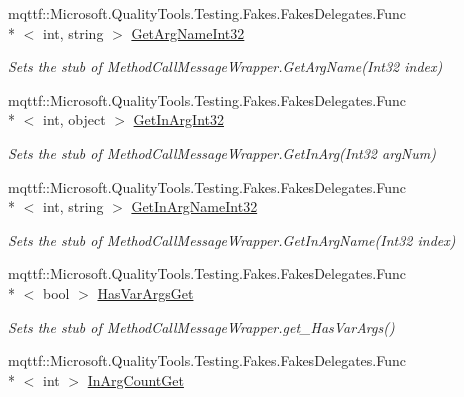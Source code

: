 \begin{DoxyCompactItemize}
mqttf\-::\-Microsoft.\-Quality\-Tools.\-Testing.\-Fakes.\-Fakes\-Delegates.\-Func\\*
$<$ int, string $>$ \hyperlink{class_system_1_1_runtime_1_1_remoting_1_1_messaging_1_1_fakes_1_1_stub_method_call_message_wrapper_a0bc601441032eaa9484d346543abc3eb}{Get\-Arg\-Name\-Int32}
\begin{DoxyCompactList}\small\item\em Sets the stub of Method\-Call\-Message\-Wrapper.\-Get\-Arg\-Name(\-Int32 index)\end{DoxyCompactList}\item 
mqttf\-::\-Microsoft.\-Quality\-Tools.\-Testing.\-Fakes.\-Fakes\-Delegates.\-Func\\*
$<$ int, object $>$ \hyperlink{class_system_1_1_runtime_1_1_remoting_1_1_messaging_1_1_fakes_1_1_stub_method_call_message_wrapper_ac3873c0ed7ba419030b9f453f2cfd1d2}{Get\-In\-Arg\-Int32}
\begin{DoxyCompactList}\small\item\em Sets the stub of Method\-Call\-Message\-Wrapper.\-Get\-In\-Arg(\-Int32 arg\-Num)\end{DoxyCompactList}\item 
mqttf\-::\-Microsoft.\-Quality\-Tools.\-Testing.\-Fakes.\-Fakes\-Delegates.\-Func\\*
$<$ int, string $>$ \hyperlink{class_system_1_1_runtime_1_1_remoting_1_1_messaging_1_1_fakes_1_1_stub_method_call_message_wrapper_a0bb145c7bf48450125aa499d054d2968}{Get\-In\-Arg\-Name\-Int32}
\begin{DoxyCompactList}\small\item\em Sets the stub of Method\-Call\-Message\-Wrapper.\-Get\-In\-Arg\-Name(\-Int32 index)\end{DoxyCompactList}\item 
mqttf\-::\-Microsoft.\-Quality\-Tools.\-Testing.\-Fakes.\-Fakes\-Delegates.\-Func\\*
$<$ bool $>$ \hyperlink{class_system_1_1_runtime_1_1_remoting_1_1_messaging_1_1_fakes_1_1_stub_method_call_message_wrapper_ab8bc85670517d3aa4d340658a4da1d6d}{Has\-Var\-Args\-Get}
\begin{DoxyCompactList}\small\item\em Sets the stub of Method\-Call\-Message\-Wrapper.\-get\-\_\-\-Has\-Var\-Args()\end{DoxyCompactList}\item 
mqttf\-::\-Microsoft.\-Quality\-Tools.\-Testing.\-Fakes.\-Fakes\-Delegates.\-Func\\*
$<$ int $>$ \hyperlink{class_system_1_1_runtime_1_1_remoting_1_1_messaging_1_1_fakes_1_1_stub_method_call_message_wrapper_a31365bcb74f00e76dabb35f3b726d949}{In\-Arg\-Count\-Get}

\end{DoxyCompactItemize}
